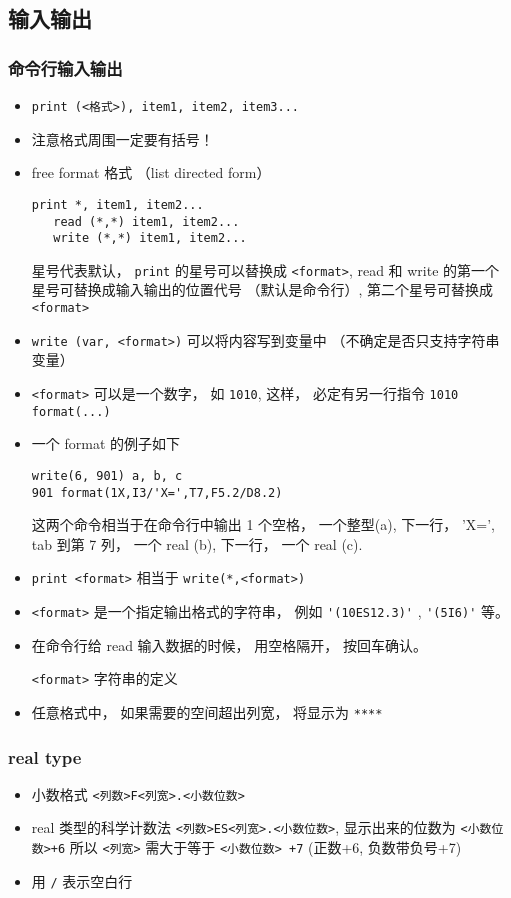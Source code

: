 \subsection{输入输出}

\subsubsection{命令行输入输出}
\begin{itemize}
\item \verb`print (<格式>), item1, item2, item3...`
\item 注意格式周围一定要有括号！
\item free format 格式 （list directed form）
\begin{lstlisting}[language=none]
   print *, item1, item2...
   read (*,*) item1, item2... 
   write (*,*) item1, item2...
\end{lstlisting}
   星号代表默认， \verb`print` 的星号可以替换成 \verb`<format>`, read 和 write 的第一个星号可替换成输入输出的位置代号 （默认是命令行）, 第二个星号可替换成 \verb`<format>`
\item \verb`write (var, <format>)` 可以将内容写到变量中 （不确定是否只支持字符串变量）
\item \verb`<format>` 可以是一个数字， 如 \verb`1010`, 这样， 必定有另一行指令 \verb`1010 format(...)`
\item 一个 format 的例子如下
\begin{lstlisting}[language=none]
write(6, 901) a, b, c
901 format(1X,I3/'X=',T7,F5.2/D8.2)
\end{lstlisting}
这两个命令相当于在命令行中输出 1 个空格， 一个整型(a), 下一行， 'X=', tab 到第 7 列， 一个 real (b), 下一行， 一个 real (c).
\item \verb`print <format>` 相当于 \verb`write(*,<format>)`
\item \verb`<format>` 是一个指定输出格式的字符串， 例如 \verb`'(10ES12.3)'` , \verb`'(5I6)'` 等。
\item 在命令行给 read 输入数据的时候， 用空格隔开， 按回车确认。

\verb`<format>` 字符串的定义
\item 任意格式中， 如果需要的空间超出列宽， 将显示为 \verb`****`
\end{itemize}

\subsubsection{real type}
\begin{itemize}
\item 小数格式 \verb`<列数>F<列宽>.<小数位数>`
\item real 类型的科学计数法  \verb`<列数>ES<列宽>.<小数位数>`, 显示出来的位数为 \verb`<小数位数>+6`
  所以 \verb`<列宽>` 需大于等于 \verb`<小数位数> +7` (正数+6, 负数带负号+7)
\item 用 \verb`/` 表示空白行
\end{itemize}


